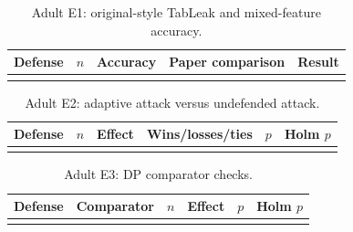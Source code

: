 \begin{table}[t]
\caption{Adult E1: original-style TabLeak and mixed-feature accuracy.}
\label{tab:adult-e1}
\centering
\begin{tabular}{lllll}
\hline
Defense & $n$ & Accuracy & Paper comparison & Result \\
\hline
\todo{...} & \todo{...} & \todo{...} & \todo{...} & \todo{...} \\
\hline
\end{tabular}
\end{table}

\begin{table}[t]
\caption{Adult E2: adaptive attack versus undefended attack.}
\label{tab:adult-e2}
\centering
\begin{tabular}{llllll}
\hline
Defense & $n$ & Effect & Wins/losses/ties & $p$ & Holm $p$ \\
\hline
\todo{...} & \todo{...} & \todo{...} & \todo{...} & \todo{...} & \todo{...} \\
\hline
\end{tabular}
\end{table}

\begin{table}[t]
\caption{Adult E3: DP comparator checks.}
\label{tab:adult-e3}
\centering
\begin{tabular}{llllll}
\hline
Defense & Comparator & $n$ & Effect & $p$ & Holm $p$ \\
\hline
\todo{...} & \todo{...} & \todo{...} & \todo{...} & \todo{...} & \todo{...} \\
\hline
\end{tabular}
\end{table}
